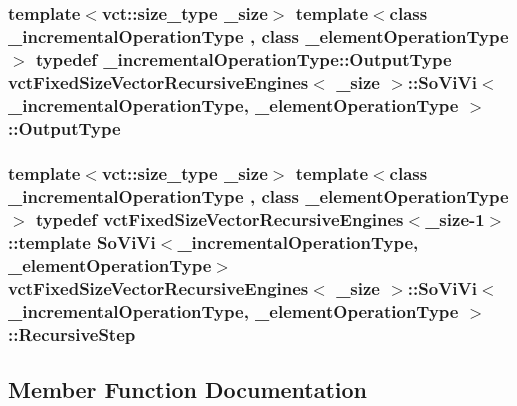\subsubsection[{Output\+Type}]{\setlength{\rightskip}{0pt plus 5cm}template$<$vct\+::size\+\_\+type \+\_\+size$>$ template$<$class \+\_\+incremental\+Operation\+Type , class \+\_\+element\+Operation\+Type $>$ typedef \+\_\+incremental\+Operation\+Type\+::\+Output\+Type {\bf vct\+Fixed\+Size\+Vector\+Recursive\+Engines}$<$ \+\_\+size $>$\+::{\bf So\+Vi\+Vi}$<$ \+\_\+incremental\+Operation\+Type, \+\_\+element\+Operation\+Type $>$\+::{\bf Output\+Type}}\label{classvct_fixed_size_vector_recursive_engines_1_1_so_vi_vi_a6d0b7f027e001b57489dcc1314ea016e}
\hypertarget{classvct_fixed_size_vector_recursive_engines_1_1_so_vi_vi_a75d4db74016f41d3bd1888e53f95f819}{}
\subsubsection[{Recursive\+Step}]{\setlength{\rightskip}{0pt plus 5cm}template$<$vct\+::size\+\_\+type \+\_\+size$>$ template$<$class \+\_\+incremental\+Operation\+Type , class \+\_\+element\+Operation\+Type $>$ typedef {\bf vct\+Fixed\+Size\+Vector\+Recursive\+Engines}$<$\+\_\+size-\/1$>$\+::template {\bf So\+Vi\+Vi}$<$\+\_\+incremental\+Operation\+Type, \+\_\+element\+Operation\+Type$>$ {\bf vct\+Fixed\+Size\+Vector\+Recursive\+Engines}$<$ \+\_\+size $>$\+::{\bf So\+Vi\+Vi}$<$ \+\_\+incremental\+Operation\+Type, \+\_\+element\+Operation\+Type $>$\+::{\bf Recursive\+Step}}\label{classvct_fixed_size_vector_recursive_engines_1_1_so_vi_vi_a75d4db74016f41d3bd1888e53f95f819}


\subsection{Member Function Documentation}
\hypertarget{classvct_fixed_size_vector_recursive_engines_1_1_so_vi_vi_a0703aa041b0662462569c1a70b7ceff9}{}
